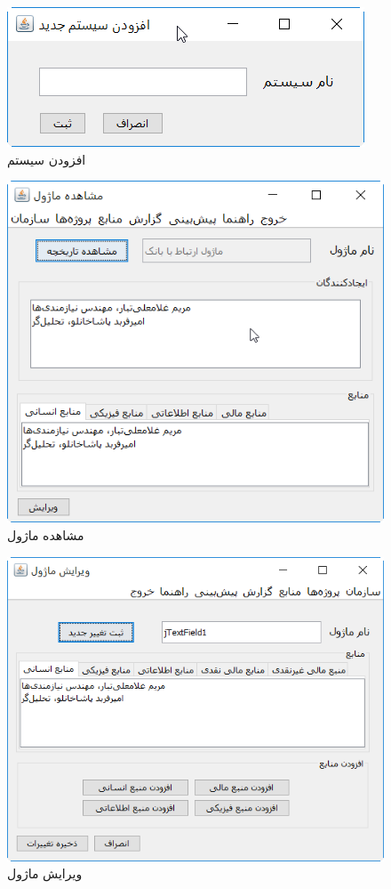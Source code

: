 \begin{figure}[H]
	\centering
	\includegraphics[scale=0.8]{img/prot/AddSystem}
	\caption{افزودن ‌سیستم }
\end{figure}
\begin{figure}[H]
	\centering
	\includegraphics[scale=0.8]{img/prot/ViewModule}
	\caption{مشاهده ‌ماژول }
\end{figure}
\begin{figure}[H]
	\centering
	\includegraphics[scale=0.8]{img/prot/EditModule}
	\caption{ویرایش ‌ماژول }
\end{figure}
